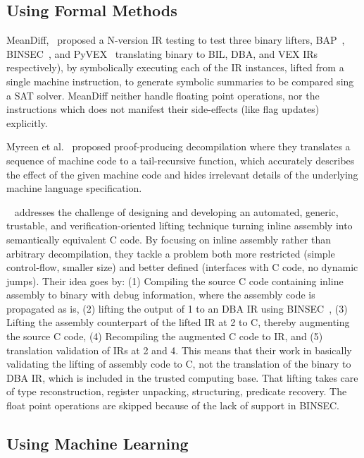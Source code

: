 \subsection{Using Formal Methods}

MeanDiff,~\cite{ASE2017} proposed a N-version IR testing to test three binary
lifters, BAP~\cite{BAP:CAV11}, BINSEC~\cite{BINSEC2011}, and PyVEX~\cite{PYVEX}
translating binary to BIL, DBA, and VEX IRs respectively), by symbolically
executing each of the IR instances, lifted from a single machine instruction,
          to generate symbolic summaries to be compared sing a SAT solver.
          MeanDiff neither handle floating point operations, nor the
          instructions which does not manifest their side-effects (like flag
              updates) explicitly.

Myreen et al.~\cite{Myreen:FMCAD:2008,Myreen:FMCAD:2012} proposed
proof-producing decompilation where they translates a sequence of machine code
to a tail-recursive function, which accurately describes the effect of the
given machine code and hides irrelevant details of the underlying machine
language specification.

~\cite{inlineassm} addresses the challenge of designing and developing an
automated, generic, trustable, and verification-oriented lifting technique
turning inline assembly into semantically equivalent C code. By focusing on
inline assembly rather than arbitrary decompilation, they tackle a problem both
more restricted (simple control-flow, smaller size) and better defined
(interfaces with C code, no dynamic jumps). Their idea goes by: (1) Compiling
the source C code containing inline assembly to binary with debug information,
    where the assembly code is propagated as is, (2) lifting the output of 1 to
    an DBA IR using BINSEC~\cite{BINSEC2011}, (3) Lifting the assembly
    counterpart of the lifted IR at 2 to C, thereby augmenting the  source C
    code, (4) Recompiling the augmented C code to IR, and (5) translation
    validation of IRs at 2 and 4. This means that their work in basically
    validating the lifting of assembly code to C, not the translation of the
    binary to DBA IR, which is included in the trusted computing base. That
    lifting takes care of type reconstruction, register unpacking, structuring,
    predicate recovery. The float point operations are skipped because of the
    lack of support in BINSEC.   

\subsection{Using Machine Learning}

